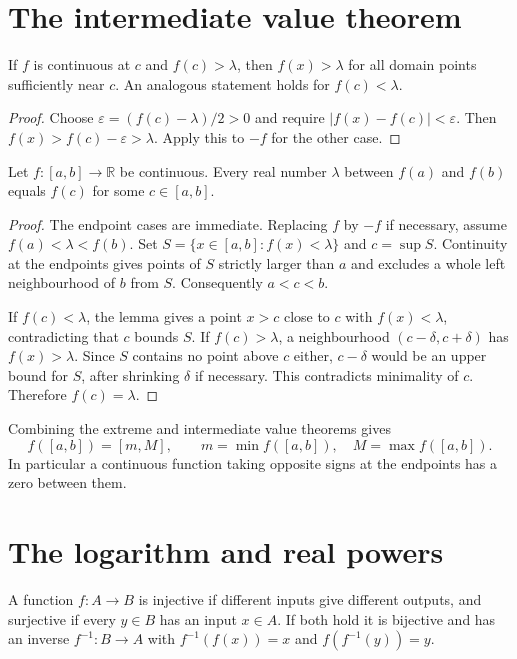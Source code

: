 \section{The intermediate value theorem}
\begin{lemma}
If $f$ is continuous at $c$ and $f(c)>\lambda$, then $f(x)>\lambda$
for all domain points sufficiently near $c$. An analogous statement holds
for $f(c)<\lambda$.
\end{lemma}
\begin{proof}
Choose $\varepsilon=(f(c)-\lambda)/2>0$ and require
$|f(x)-f(c)|<\varepsilon$. Then
$f(x)>f(c)-\varepsilon>\lambda$. Apply this to $-f$ for the other case.
\end{proof}

\begin{theorem}\label{thm:analysis-ivt}
Let $f:[a,b]\to\mathbb R$ be continuous. Every real number $\lambda$
between $f(a)$ and $f(b)$ equals $f(c)$ for some $c\in[a,b]$.
\end{theorem}
\begin{proof}
The endpoint cases are immediate. Replacing $f$ by $-f$ if necessary,
assume $f(a)<\lambda<f(b)$. Set
$S=\{x\in[a,b]:f(x)<\lambda\}$ and $c=\sup S$.
Continuity at the endpoints gives points of $S$ strictly larger than $a$
and excludes a whole left neighbourhood of $b$ from $S$.
Consequently $a<c<b$.

If $f(c)<\lambda$, the lemma gives a point $x>c$ close to $c$ with
$f(x)<\lambda$, contradicting that $c$ bounds $S$.
If $f(c)>\lambda$, a neighbourhood $(c-\delta,c+\delta)$ has
$f(x)>\lambda$. Since $S$ contains no point above $c$ either,
$c-\delta$ would be an upper bound for $S$, after shrinking $\delta$
if necessary. This contradicts minimality of $c$.
Therefore $f(c)=\lambda$.
\end{proof}

Combining the extreme and intermediate value theorems gives
\[
f([a,b])=[m,M],\qquad m=\min f([a,b]),\quad M=\max f([a,b]).
\]
In particular a continuous function taking opposite signs at the endpoints
has a zero between them.

\section{The logarithm and real powers}
\begin{definition}
A function $f:A\to B$ is injective if different inputs give different
outputs, and surjective if every $y\in B$ has an input $x\in A$.
If both hold it is bijective and has an inverse $f^{-1}:B\to A$ with
$f^{-1}(f(x))=x$ and $f(f^{-1}(y))=y$.
\end{definition}

